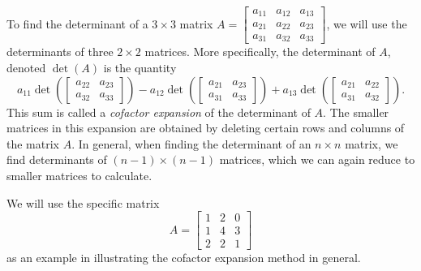 To find the determinant of a $3 \times 3$ matrix $A = \left[ \begin {array}{ccc} a_{11}&a_{12}&a_{13} \\ a_{21}&a_{22}&a_{23}\\ a_{31}&a_{32}&a_{33}\end {array} \right]$, we will use the determinants of three $2\times 2$ matrices. More specifically, the determinant of $A$, denoted $\det(A)$ is the quantity
\begin{equation} \label{eq:det_3by3}
a_{11} \det\left(\left[ \begin{array}{cc} a_{22}&a_{23} \\ a_{32}&a_{33} \end{array} \right] \right)- a_{12} \det \left(\left[ \begin{array}{cc} a_{21}&a_{23} \\ a_{31}&a_{33} \end{array} \right] \right) + a_{13} \det \left(\left[ \begin{array}{cc} a_{21}&a_{22} \\ a_{31}&a_{32} \end{array} \right] \right).
\end{equation}
This sum is called a \emph{cofactor expansion} of the determinant of $A$. The smaller matrices in this expansion are obtained by deleting certain rows and columns of the matrix $A$. In general, when finding the determinant of an $n\times n$ matrix, we find determinants of $(n-1)\times (n-1)$ matrices, which we can again reduce to smaller matrices to calculate.

We will use the specific matrix 
\[ A = \left[ \begin{array}{ccc} 1 & 2 & 0 \\ 1 & 4 & 3 \\ 2 & 2 & 1\end{array} \right] \]
as an example in illustrating the cofactor expansion method in general.

